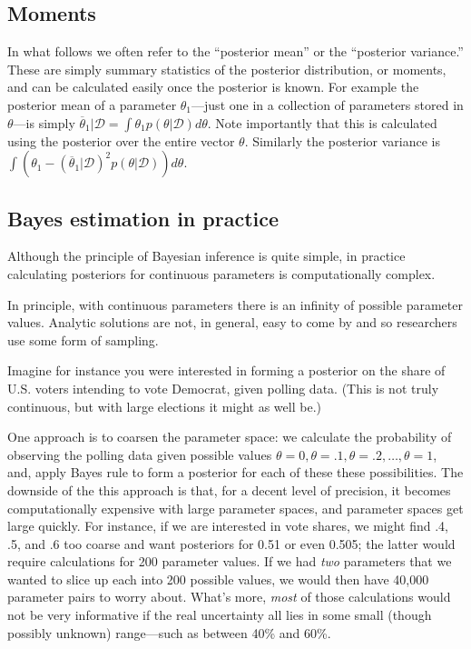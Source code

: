 \documentclass[
  12pt,
]{book}
\begin{document}
\hypertarget{moments}{%
\subsection{Moments}\label{moments}}

In what follows we often refer to the ``posterior mean'' or the ``posterior variance.'' These are simply summary statistics of the posterior distribution, or moments, and can be calculated easily once the posterior is known. For example the posterior mean of a parameter \(\theta_1\)---just one in a collection of parameters stored in \(\theta\)---is simply \(\overline{\theta}_1 | \mathcal{D} = \int \theta_1 p(\theta | \mathcal{D}) d\theta\). Note importantly that this is calculated using the posterior over the entire vector \(\theta\). Similarly the posterior variance is \(\int (\theta_1 - (\overline{\theta}_1 | \mathcal{D})^2 p(\theta | \mathcal{D})) d\theta\).

\hypertarget{bayes-estimation-in-practice}{%
\subsection{Bayes estimation in practice}\label{bayes-estimation-in-practice}}

Although the principle of Bayesian inference is quite simple, in practice calculating posteriors for continuous parameters is computationally complex.

In principle, with continuous parameters there is an infinity of possible parameter values. Analytic solutions are not, in general, easy to come by and so researchers use some form of sampling.

Imagine for instance you were interested in forming a posterior on the share of U.S. voters intending to vote Democrat, given polling data. (This is not truly continuous, but with large elections it might as well be.)

One approach is to coarsen the parameter space: we calculate the probability of observing the polling data given possible values \(\theta = 0, \theta = .1, \theta = .2, \dots, \theta = 1\), and, apply Bayes rule to form a posterior for each of these these possibilities. The downside of the this approach is that, for a decent level of precision, it becomes computationally expensive with large parameter spaces, and parameter spaces get large quickly. For instance, if we are interested in vote shares, we might find .4, .5, and .6 too coarse and want posteriors for 0.51 or even 0.505; the latter would require calculations for 200 parameter values. If we had \emph{two} parameters that we wanted to slice up each into 200 possible values, we would then have 40,000 parameter pairs to worry about. What's more, \emph{most} of those calculations would not be very informative if the real uncertainty all lies in some small (though possibly unknown) range---such as between 40\% and 60\%.
\end{document}

